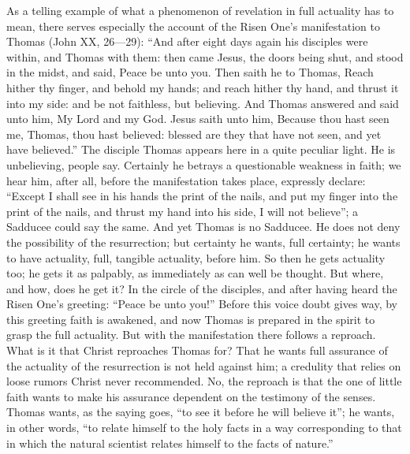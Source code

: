 \documentclass[12pt]{book}
\newcommand{\opage}[1]{\marginnote{\footnotesize\textit{[#1]}}}
\begin{document}
As a telling example of what a phenomenon of revelation in full
actuality has to mean, there serves especially the account of the Risen
One's manifestation to Thomas (John XX, 26---29): ``And after eight days
again his disciples were within, and Thomas with them: then came Jesus,
the doors being shut, and stood in the midst, and said, Peace be unto
you. Then saith he to Thomas, Reach hither thy finger, and behold my
hands; and reach hither thy hand, and thrust it into my side: and be not
faithless, but believing. And Thomas answered and said unto him, My Lord
and my God. Jesus saith unto him, Because thou
\opage{174}\setcounter{footnote}{0}%
hast seen me, Thomas, thou hast believed: blessed are they that have not
seen, and yet have believed.'' The disciple Thomas appears here in a
quite peculiar light. He is unbelieving, people say. Certainly he
betrays a questionable weakness in faith; we hear him, after all,
before the manifestation takes place, expressly declare: ``Except I
shall see in his hands the print of the nails, and put my finger into
the print of the nails, and thrust my hand into his side, I will not
believe''; a Sadducee could say the same. And yet Thomas is no Sadducee.
He does not deny the possibility of the resurrection; but certainty he
wants, full certainty; he wants to have actuality, full, tangible
actuality, before him. So then he gets actuality too; he gets it as
palpably, as immediately as can well be thought. But where, and how,
does he get it? In the circle of the disciples, and after having heard
the Risen One's greeting: ``Peace be unto you!'' Before this voice doubt
gives way, by this greeting faith is awakened, and now Thomas is
prepared in the spirit to grasp the full actuality. But with the
manifestation there follows a reproach. What is it that Christ
reproaches Thomas for? That he wants full assurance of the actuality of
the resurrection is not held against him; a credulity that relies on
loose rumors Christ never recommended. No, the reproach is that the one
of little faith wants to make his assurance dependent on the testimony
of the senses. Thomas wants, as the saying goes, ``to see it before he
will believe it''; he wants, in other words, ``to relate himself to the
holy facts in a way corresponding to that in which the natural scientist
relates himself to the facts of nature.''
\end{document}
